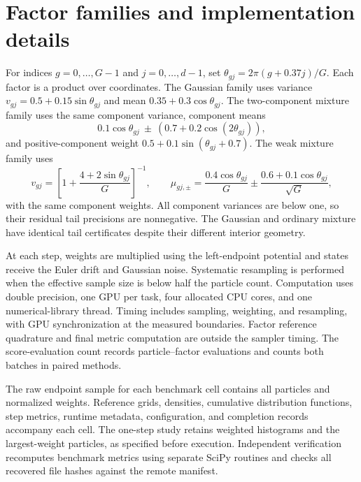 \section{Factor families and implementation details}\label{app:protocol}
For indices $g=0,\ldots,G-1$ and $j=0,\ldots,d-1$, set $\theta_{gj}=2\pi(g+0.37j)/G$. Each factor is a product over coordinates. The Gaussian family uses variance $v_{gj}=0.5+0.15\sin\theta_{gj}$ and mean $0.35+0.3\cos\theta_{gj}$. The two-component mixture family uses the same component variance, component means
\[
 0.1\cos\theta_{gj}\ \pm\ (0.7+0.2\cos(2\theta_{gj})),
\]
and positive-component weight $0.5+0.1\sin(\theta_{gj}+0.7)$. The weak mixture family uses
\[
 v_{gj}=\left[1+\frac{4+2\sin\theta_{gj}}G\right]^{-1},\qquad
 \mu_{gj,\pm}=\frac{0.4\cos\theta_{gj}}G
 \pm\frac{0.6+0.1\cos\theta_{gj}}{\sqrt G},
\]
with the same component weights. All component variances are below one, so their residual tail precisions are nonnegative. The Gaussian and ordinary mixture have identical tail certificates despite their different interior geometry.

At each step, weights are multiplied using the left-endpoint potential and states receive the Euler drift and Gaussian noise. Systematic resampling is performed when the effective sample size is below half the particle count. Computation uses double precision, one GPU per task, four allocated CPU cores, and one numerical-library thread. Timing includes sampling, weighting, and resampling, with GPU synchronization at the measured boundaries. Factor reference quadrature and final metric computation are outside the sampler timing. The score-evaluation count records particle--factor evaluations and counts both batches in paired methods.

The raw endpoint sample for each benchmark cell contains all particles and normalized weights. Reference grids, densities, cumulative distribution functions, step metrics, runtime metadata, configuration, and completion records accompany each cell. The one-step study retains weighted histograms and the largest-weight particles, as specified before execution. Independent verification recomputes benchmark metrics using separate SciPy routines and checks all recovered file hashes against the remote manifest.
